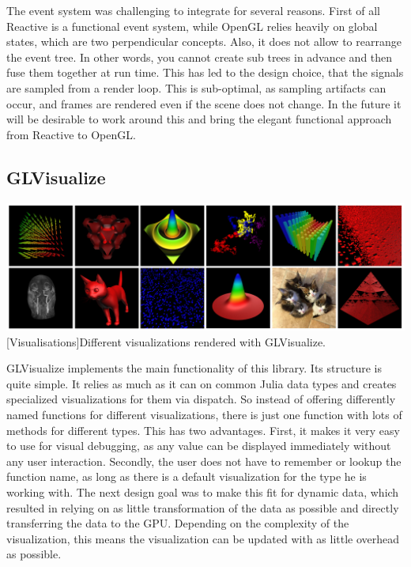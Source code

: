 The event system was challenging to integrate for several reasons.
First of all Reactive is a functional event system, while \ac{OpenGL} relies heavily on global states, which are two perpendicular concepts.
Also, it does not allow to rearrange the event tree. 
In other words, you cannot create sub trees in advance and then fuse them together at run time.
This has led to the design choice, that the signals are sampled from a render loop.
This is sub-optimal, as sampling artifacts can occur, and frames are rendered even if the scene does not change.
In the future it will be desirable to work around this and bring the elegant functional approach from Reactive to OpenGL.


\subsection{GLVisualize}

\vspace{1em}
\begin{minipage}{\linewidth}
    \centering
    \includegraphics[width=0.9\linewidth]{graphics/glvisualize.jpg}
    [Visualisations]{Different visualizations rendered with GLVisualize.}
    \label{fig:glvisualize}
\end{minipage}

GLVisualize implements the main functionality of this library.
Its structure is quite simple. 
It relies as much as it can on common Julia data types and creates specialized visualizations for them via dispatch.
So instead of offering differently named functions for different visualizations, there is just one function with lots of methods for different types.
This has two advantages.
First, it makes it very easy to use for visual debugging, as any value can be displayed immediately without any user interaction.
Secondly, the user does not have to remember or lookup the function name, as long as there is a default visualization for the type he is working with.
The next design goal was to make this fit for dynamic data, which resulted in relying on as little transformation of the data as possible and directly transferring the data to the GPU.
Depending on the complexity of the visualization, this means the visualization can be updated with as little overhead as possible.

